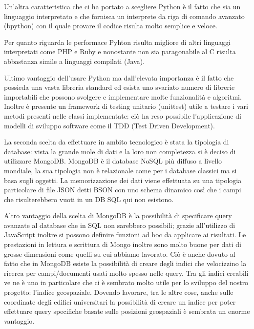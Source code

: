 \documentclass[12pt]{report}
\begin{document}
Un'altra caratteristica che ci ha portato a scegliere Python è il fatto che sia un linguaggio interpretato e che fornisca un interprete da riga di comando avanzato (bpython) con il quale provare il codice risulta molto semplice e veloce. 

Per quanto riguarda le performace Pyhton risulta migliore di altri linguaggi interpretati come PHP e Ruby e nonostante non sia paragonabile al C risulta abbastanza simile a linguaggi compilati (Java).

Ultimo vantaggio dell'usare Python ma dall'elevata importanza è il fatto che possieda una vasta libreria standard ed esista uno svariato numero di librerie importabili che possono svolgere e implementare molte funzionalità e algoritmi. Inoltre è presente un framework di testing unitario (unittest) utile a testare i vari metodi presenti nelle classi implementate: ciò ha reso possibile l'applicazione di modelli di sviluppo software come il TDD (Test Driven Development).

\vspace{5mm} %

La seconda scelta da effettuare in ambito tecnologico è stata la tipologia di database: vista la grande mole di dati e la loro non completezza si è deciso di utilizzare MongoDB. MongoDB è il database NoSQL più diffuso a livello mondiale, la sua tipologia non è relazionale come per i database classici ma si basa sugli oggetti. La memorizzazione dei dati viene effettuata su una tipologia particolare di file JSON detti BSON con uno schema dinamico così che i campi che risulterebbero vuoti in un DB SQL qui non esistono. 

Altro vantaggio della scelta di MongoDB è la possibilità di specificare query avanzate al database che in SQL non sarebbero possibili; grazie all'utilizzo di JavaScript inoltre si possono definire funzioni ad hoc da applicare ai risultati. Le prestazioni in lettura e scrittura di Mongo inoltre sono molto buone per dati di grosse dimensioni come quelli su cui abbiamo lavorato. Ciò è anche dovuto al fatto che in MongoDB esiste la possibilità di creare degli indici che velocizzino la ricerca per campi/documenti usati molto spesso nelle query. Tra gli indici creabili ve ne è uno in particolare che ci è sembrato molto utile per lo sviluppo del nostro progetto: l'indice geospaziale. Dovendo lavorare, tra le altre cose, anche sulle coordinate degli edifici universitari la possibilità di creare un indice per poter effettuare query specifiche basate sulle posizioni geospaziali è sembrata un enorme vantaggio.
\end{document}
